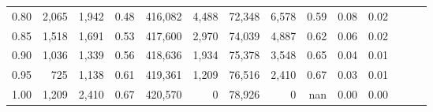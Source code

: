 \begin{tabular}{rrrrrrrrrrrrrr}
0.80 &   2,065 &  1,942 &  0.48 &  416,082 &    4,488 &  72,348 &   6,578 &  0.59 &  0.08 &      0.02 \\
0.85 &   1,518 &  1,691 &  0.53 &  417,600 &    2,970 &  74,039 &   4,887 &  0.62 &  0.06 &      0.02 \\
0.90 &   1,036 &  1,339 &  0.56 &  418,636 &    1,934 &  75,378 &   3,548 &  0.65 &  0.04 &      0.01 \\
0.95 &     725 &  1,138 &  0.61 &  419,361 &    1,209 &  76,516 &   2,410 &  0.67 &  0.03 &      0.01 \\
1.00 &   1,209 &  2,410 &  0.67 &  420,570 &        0 &  78,926 &       0 &   nan &  0.00 &      0.00 \\
\bottomrule
\end{tabular}
